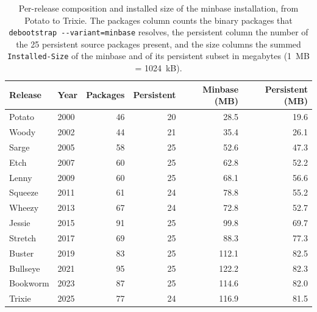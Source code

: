 \begin{table}[ht!]
  \centering
  \setcapindent{0pt}
  \renewcommand{\arraystretch}{0.95}
  \caption[Per-release composition and installed size of the minbase installation.]{Per-release composition and installed size of the minbase installation, from Potato to Trixie. The packages column counts the binary packages that \texttt{debootstrap -{}-variant=minbase} resolves, the persistent column the number of the 25 persistent source packages present, and the size columns the summed \texttt{Installed-Size} of the minbase and of its persistent subset in megabytes (1~MB = 1024~kB).}
  \label{tab:metrics-size}
  \footnotesize
  \begin{tabular}{llrrrr}
    \hline
    Release & Year & Packages & Persistent & Minbase (MB) & Persistent (MB) \\
    \hline
    Potato   & 2000 & 46 & 20 & 28.5  & 19.6 \\
    Woody    & 2002 & 44 & 21 & 35.4  & 26.1 \\
    Sarge    & 2005 & 58 & 25 & 52.6  & 47.3 \\
    Etch     & 2007 & 60 & 25 & 62.8  & 52.2 \\
    Lenny    & 2009 & 60 & 25 & 68.1  & 56.6 \\
    Squeeze  & 2011 & 61 & 24 & 78.8  & 55.2 \\
    Wheezy   & 2013 & 67 & 24 & 72.8  & 52.7 \\
    Jessie   & 2015 & 91 & 25 & 99.8  & 69.7 \\
    Stretch  & 2017 & 69 & 25 & 88.3  & 77.3 \\
    Buster   & 2019 & 83 & 25 & 112.1 & 82.5 \\
    Bullseye & 2021 & 95 & 25 & 122.2 & 82.3 \\
    Bookworm & 2023 & 87 & 25 & 114.6 & 82.0 \\
    Trixie   & 2025 & 77 & 24 & 116.9 & 81.5 \\
    \hline
  \end{tabular}
\end{table}

